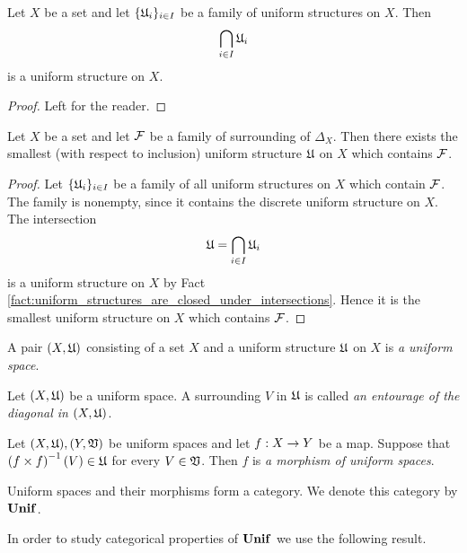 \begin{fact}\label{fact:uniform_structures_are_closed_under_intersections}
Let $X$ be a set and let $\{{\mathfrak U}_i\}_{i\in I}$ be a family of uniform structures on $X$. Then 
$$\bigcap_{i\in I}{\mathfrak U}_i$$
is a uniform structure on $X$.
\end{fact}
\begin{proof}
Left for the reader.
\end{proof}

\begin{corollary}\label{corollary:smallest_uniform_structure_containing_given_family_of_surroundings}
Let $X$ be a set and let ${\mathcal F}$ be a family of surrounding of $\Delta_X$. Then there exists the smallest (with respect to inclusion) uniform structure ${\mathfrak U}$ on $X$ which contains ${\mathcal F}$.
\end{corollary}
\begin{proof}
Let $\{{\mathfrak U}_i\}_{i\in I}$ be a family of all uniform structures on $X$ which contain ${\mathcal F}$. The family is nonempty, since it contains the discrete uniform structure on $X$. The intersection $${\mathfrak U} = \bigcap_{i\in I}{\mathfrak U}_i$$
is a uniform structure on $X$ by Fact \ref{fact:uniform_structures_are_closed_under_intersections}. Hence it is the smallest uniform structure on $X$ which contains ${\mathcal F}$.
\end{proof}

\begin{definition}
A pair $(X,{\mathfrak U})$ consisting of a set $X$ and a uniform structure ${\mathfrak U}$ on $X$ is \textit{a uniform space}.
\end{definition}

\begin{definition}
Let $(X,{\mathfrak U})$ be a uniform space. A surrounding $V$ in ${\mathfrak U}$ is called \textit{an entourage of the diagonal in $(X,{\mathfrak U})$}. 
\end{definition}

\begin{definition}
Let $(X,{\mathfrak U}),(Y,{\mathfrak V})$ be uniform spaces and let $f:X\rightarrow Y$ be a map. Suppose that $\left(f\times f\right)^{-1}(V) \in {\mathfrak U}$ for every $V\in {\mathfrak V}$. Then $f$ is \textit{a morphism of uniform spaces}. 
\end{definition}

\begin{remark}\label{remark:category_of_uniform_spaces}
Uniform spaces and their morphisms form a category. We denote this category by $\mathbf{Unif}$.
\end{remark}
\noindent
In order to study categorical properties of $\mathbf{Unif}$ we use the following result.

